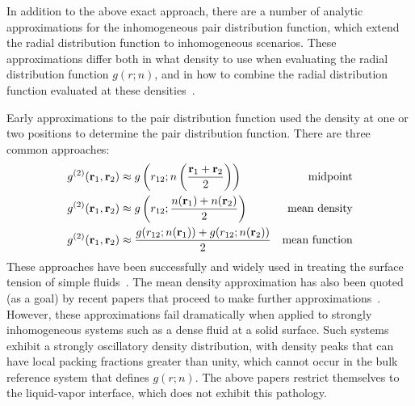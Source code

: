 In addition to the above exact approach, there are a number of
analytic approximations for the inhomogeneous pair distribution
function, which extend the radial distribution function to
inhomogeneous scenarios.  These approximations differ both in what
density to use when evaluating the radial distribution function
$g(r;n)$, and in how to combine the radial distribution function
evaluated at these densities~\cite{toxvaerd1973statistical}.

Early approximations to the pair distribution function used the
density at one or two positions to determine the pair distribution
function.  There are three common approaches:
\begin{align}
  g^{(2)}(\textbf{r}_1,\textbf{r}_2) &\approx
  g\left(r_{12}; n\left(\frac{\textbf{r}_1+\textbf{r}_2}{2}\right)\right)
     & \text{midpoint} \\
  g^{(2)}(\textbf{r}_1,\textbf{r}_2) &\approx
  g\left(r_{12}; \frac{n(\textbf{r}_1)+n(\textbf{r}_2)}{2}\right)
     & \text{mean density} \\
  g^{(2)}(\textbf{r}_1,\textbf{r}_2) &\approx
  \frac{g(r_{12};n(\textbf{r}_1))+g(r_{12};n(\textbf{r}_2))}{2}
     & \text{mean function}\label{eq:mean-function}
\end{align}
These approaches have been successfully and widely used in treating
the surface tension of simple fluids~\cite{pressing2003surface,
  salter2008statistical, bongiorno1975modified,
  toxvaerd1976hydrostatic, kalos1977structure, carey2008gradient,
  osborn1980monotonic, mccoy1981comparison, barrett2006some}.  The
mean density approximation has also been quoted (as a goal) by recent
papers that proceed to make further
approximations~\cite{gloor2007prediction, gross2009density}.  However,
these approximations fail dramatically when applied to strongly
inhomogeneous systems such as a dense fluid at a solid surface.  Such
systems exhibit a strongly oscillatory density distribution, with
density peaks that can have local packing fractions greater than
unity, which cannot occur in the bulk reference system that defines
$g(r; n)$.  The above papers restrict themselves to the liquid-vapor
interface, which does not exhibit this pathology.

